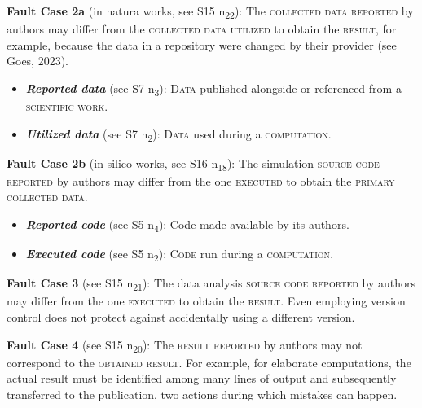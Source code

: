 \documentclass[authordate, meta]{jote-new-article}
\begin{document}
	


	\noindent \textbf{Fault Case 2a} (in natura works, see S15 \rightarrow{ }n\textsubscript{22}): The \textsc{collected data reported} by authors may differ from the \textsc{collected data utilized }to obtain the \textsc{result}, for example, because the data in a repository were changed by their provider (see Goes, 2023).

	\begin{itemize}[label=\phantom{\textbullet},topsep=0pt]
		\item \textbf{\emph{Reported data}} (see S7 \rightarrow{ }n\textsubscript{3}): \textsc{Data} published alongside or referenced from a \textsc{scientific work}.

		\item \textbf{\emph{Utilized data}} (see S7 \rightarrow{ }n\textsubscript{2}): \textsc{Data} used during a \textsc{computation}.
	\end{itemize}

	


	


	\noindent \textbf{Fault Case 2b} (in silico works, see S16 \rightarrow{ }n\textsubscript{18}): The simulation \textsc{source code reported} by authors may differ from the one \textsc{executed} to obtain the \textsc{primary collected data}.


	\begin{itemize}[label=\phantom{\textbullet},topsep=0pt]
		\item \textbf{\emph{Reported code}} (see S5 \rightarrow{ }n\textsubscript{4}): Code made available by its authors.

		\item \textbf{\emph{Executed code}} (see S5 \rightarrow{ }n\textsubscript{2}): \textsc{Code} run during a \textsc{computation}.
	\end{itemize}

	


	


	\noindent \textbf{Fault Case 3} (see S15 \rightarrow{ }n\textsubscript{21}): The data analysis \textsc{source code reported} by authors may differ from the one \textsc{executed} to obtain the \textsc{result}. Even employing version control does not protect against accidentally using a different version.


	\noindent \textbf{Fault Case 4} (see S15 \rightarrow{ }n\textsubscript{20}): The \textsc{result reported} by authors may not correspond to the \textsc{obtained result}. For example, for elaborate computations, the actual result must be identified among many lines of output and subsequently transferred to the publication, two actions during which mistakes can happen.
\end{document}

